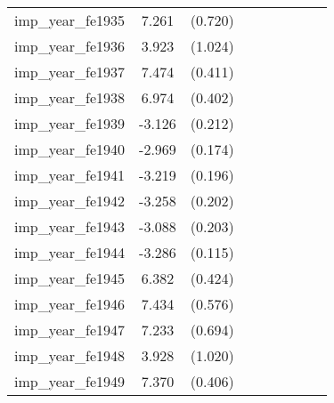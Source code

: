 {\begin{tabular}{l*{4}{cc}}
imp\_year\_fe1935&    7.261\sym{***}&  (0.720)&                  &         &                  &         &                  &         \\
imp\_year\_fe1936&    3.923\sym{***}&  (1.024)&                  &         &                  &         &                  &         \\
imp\_year\_fe1937&    7.474\sym{***}&  (0.411)&                  &         &                  &         &                  &         \\
imp\_year\_fe1938&    6.974\sym{***}&  (0.402)&                  &         &                  &         &                  &         \\
imp\_year\_fe1939&   -3.126\sym{***}&  (0.212)&                  &         &                  &         &                  &         \\
imp\_year\_fe1940&   -2.969\sym{***}&  (0.174)&                  &         &                  &         &                  &         \\
imp\_year\_fe1941&   -3.219\sym{***}&  (0.196)&                  &         &                  &         &                  &         \\
imp\_year\_fe1942&   -3.258\sym{***}&  (0.202)&                  &         &                  &         &                  &         \\
imp\_year\_fe1943&   -3.088\sym{***}&  (0.203)&                  &         &                  &         &                  &         \\
imp\_year\_fe1944&   -3.286\sym{***}&  (0.115)&                  &         &                  &         &                  &         \\
imp\_year\_fe1945&    6.382\sym{***}&  (0.424)&                  &         &                  &         &                  &         \\
imp\_year\_fe1946&    7.434\sym{***}&  (0.576)&                  &         &                  &         &                  &         \\
imp\_year\_fe1947&    7.233\sym{***}&  (0.694)&                  &         &                  &         &                  &         \\
imp\_year\_fe1948&    3.928\sym{***}&  (1.020)&                  &         &                  &         &                  &         \\
imp\_year\_fe1949&    7.370\sym{***}&  (0.406)&                  &         &                  &         &                  &         \\

\end{tabular}}
